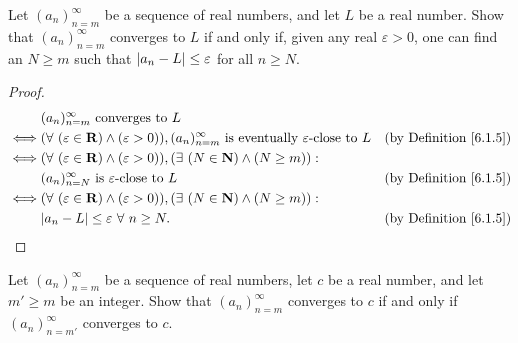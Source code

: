 \begin{exercise}\label{ex 6.1.2}
    Let \((a_n)_{n = m}^\infty\) be a sequence of real numbers, and let \(L\) be a real number.
    Show that \((a_n)_{n = m}^\infty\) converges to \(L\) if and only if, given any real \(\varepsilon > 0\), one can find an \(N \geq m\) such that \(\abs*{a_n - L} \leq \varepsilon\) for all \(n \geq N\).
\end{exercise}

\begin{proof}
    \begin{align*}
             & (a_n)_{n = m}^\infty \text{ converges to } L                                                                                                                                     \\
        \iff & (\forall\ (\varepsilon \in \mathbf{R}) \land (\varepsilon > 0)), (a_n)_{n = m}^\infty \text{ is eventually } \varepsilon\text{-close to } L & \text{(by Definition \ref{6.1.5})} \\
        \iff & (\forall\ (\varepsilon \in \mathbf{R}) \land (\varepsilon > 0)), (\exists\ (N \in \mathbf{N}) \land (N \geq m)) :                                                                \\
             & (a_n)_{n = N}^\infty \text{ is } \varepsilon\text{-close to } L                                                                             & \text{(by Definition \ref{6.1.5})} \\
        \iff & (\forall\ (\varepsilon \in \mathbf{R}) \land (\varepsilon > 0)), (\exists\ (N \in \mathbf{N}) \land (N \geq m)) :                                                                \\
             & \abs*{a_n - L} \leq \varepsilon \ \forall\ n \geq N.                                                                                        & \text{(by Definition \ref{6.1.5})}
    \end{align*}
\end{proof}

\begin{exercise}\label{ex 6.1.3}
    Let \((a_n)_{n = m}^\infty\) be a sequence of real numbers, let \(c\) be a real number, and let \(m' \geq m\) be an integer.
    Show that \((a_n)_{n = m}^\infty\) converges to \(c\) if and only if \((a_n)_{n = m'}^\infty\) converges to \(c\).
\end{exercise}

